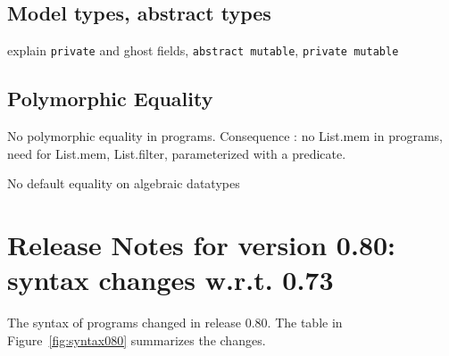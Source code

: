 \documentclass[a4paper,11pt,twoside,openright]{memoir}
\begin{document}
\subsection{Model types, abstract types}

explain \texttt{private} and ghost fields, \texttt{abstract mutable},
\texttt{private mutable}

\subsection{Polymorphic Equality}

No polymorphic equality in programs. Consequence : no List.mem in
programs, need for List.mem, List.filter, parameterized with a
predicate.

No default equality on algebraic datatypes

\section{Release Notes for version 0.80: syntax changes w.r.t. 0.73}

The syntax of \whyml programs changed in release 0.80.
The table in Figure~\ref{fig:syntax080} summarizes the changes.
\end{document}
